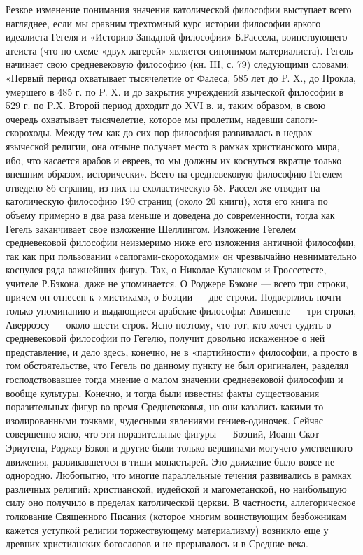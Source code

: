 Резкое изменение  понимания значения католической  философии выступает
всего  нагляднее, если  мы сравним  трехтомный курс  истории философии
яркого  идеалиста Гегеля  и  «Историю  Западной философии»  Б.Рассела,
воинствующего атеиста (что по  схеме «двух лагерей» является синонимом
материалиста). Гегель начинает свою  средневековую философию (кн. III,
с. 79)  следующими словами:  «Первый период охватывает  тысячелетие от
Фалеса,  585 лет  до P.  X., до  Прокла, умершего  в 485  г. по  P. X.
и  до  закрытия  учреждений  языческой  философии в  529  г.  по  P.X.
Второй  период доходит  до XVI  в. и,  таким образом,  в свою  очередь
охватывает тысячелетие, которое мы пролетим, надевши сапоги-скороходы.
Между  тем как  до сих  пор философия  развивалась в  недрах языческой
религии,  она  отныне  получает  место в  рамках  христианского  мира,
ибо,  что  касается  арабов  и  евреев,  то  мы  должны  их  коснуться
вкратце только  внешним образом, исторически». Всего  на средневековую
философию Гегелем  отведено 86 страниц,  из них на  схоластическую 58.
Рассел же  отводит на  католическую философию  190 страниц  (около 20%
книги),  хотя  его книга  по  объему  примерно  в  два раза  меньше  и
доведена до современности, тогда как Гегель заканчивает свое изложение
Шеллингом.  Изложение   Гегелем  средневековой   философии  неизмеримо
ниже  его  изложения  античной  философии,  так  как  при  пользовании
«сапогами-скороходами»  он  чрезвычайно  невнимательно  коснулся  ряда
важнейших  фигур.  Так, о  Николае  Кузанском  и Гроссетесте,  учителе
Р.Бэкона, даже не упоминается. О  Роджере Бэконе --- всего три строки,
причем он отнесен  к «мистикам», о Боэции ---  две строки. Подверглись
почти только  упоминанию и выдающиеся арабские  философы: Авиценне ---
три  строки,  Аверроэсу  ---  около шести  строк.  Ясно  поэтому,  что
тот, кто  хочет судить  о средневековой  философии по  Гегелю, получит
довольно  искаженное  о  ней  представление, и  дело  здесь,  конечно,
не  в «партийности»  философии,  а просто  в  том обстоятельстве,  что
Гегель по данному пункту  не был оригинален, разделял господствовавшее
тогда  мнение  о  малом  значении  средневековой  философии  и  вообще
культуры.  Конечно,   и  тогда   были  известны   факты  существования
поразительных фигур во время  Средневековья, но они казались какими-то
изолированными  точками, чудесными  явлениями гениев-одиночек.  Сейчас
совершенно ясно, что  эти поразительные фигуры ---  Боэций, Иоанн Скот
Эриугена,  Роджер  Бэкон  и  другие  были  только  вершинами  могучего
умственного движения,  развивавшегося в тиши монастырей.  Это движение
было вовсе  не однородно.  Любопытно, что многие  параллельные течения
развивались  в рамках  различных  религий:  христианской, иудейской  и
магометанской, но наибольшую силу оно получило в пределах католической
церкви.  В  частности,  аллегорическое толкование  Священного  Писания
(которое  многим  воинствующим  безбожникам кажется  уступкой  религии
торжествующему  материализму)  возникло  еще  у  древних  христианских
богословов и не прерывалось и в Средние века.

